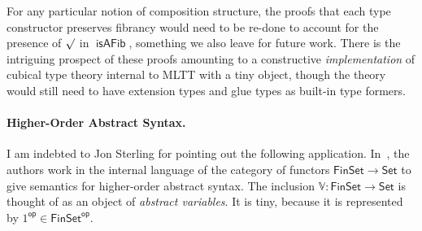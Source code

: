 \documentclass[10pt]{article}
\makeatletter
\theoremstyle{definition}
\let\oldequiv\equiv%
\renewcommand{\equiv}{\simeq}
\newcommand{\defeq}{\oldequiv}
\newcommand{\@thesum}[1]{\smsym_{(#1)}}
\newcommand{\sm}[1]{\@ifnextchar\bgroup{\@sm{#1}\sm}{\@sm{#1}}}
\newcommand{\@sm}[1]{\mathchoice{{\textstyle\@thesum{#1}}}{\@thesum{#1}}{\@thesum{#1}}{\@thesum{#1}}}
\def\prdsym{\prod}
\newcommand{\@theprd}[1]{\prdsym_{(#1)}}
\newcommand{\prd}[1]{\@ifnextchar\bgroup{\@prd{#1}\prd}{\@prd{#1}}}
\newcommand{\@prd}[1]{\mathchoice{{\textstyle\@theprd{#1}}}{\@theprd{#1}}{\@theprd{#1}}{\@theprd{#1}}}
\newcommand{\lockn}[1]{\mathcal{#1}}
\newcommand{\stubra}[1]{\{\!\!\{ #1 \}\!\!\}}
\newcommand{\substuck}[2]{\stubra{#1/\lockn{#2}}}
\newcommand{\rformsym}{\surd}
\newcommand{\rforme}[2]{\ThisStyle{\raisebox{0.07em}{$\SavedStyle \rformsym_{\hspace{-0.25em}#1}$}} #2}
\newcommand{\rform}[2]{\rforme{\lockn{#1}}{#2}}
\newcommand{\op}{\mathsf{op}}
\newcommand{\Set}{\mathsf{Set}}
\newcommand{\univfib}{\mathsf{U}}
\DeclareMathOperator{\isAFib}{\mathsf{isAFib}}
\DeclareMathOperator{\AFib}{\mathsf{AFib}}
\newcommand{\Compstr}{\mathsf{C}}
\makeatother
\begin{document}
For any particular notion of composition structure, the proofs that
each type constructor preserves fibrancy would need to be re-done to
account for the presence of $\rformsym$ in $\isAFib$, something we
also leave for future work. There is the intriguing prospect of these
proofs amounting to a constructive \emph{implementation} of cubical
type theory internal to MLTT with a tiny object, though the
theory would still need to have extension types and glue types as
built-in type formers.

\paragraph{Higher-Order Abstract Syntax.}

\newcommand{\Viny}{\mathbb{V}}
\newcommand{\iTm}{\mathtt{Tm}}
\newcommand{\ivar}{\mathtt{var}}
\newcommand{\ilam}{\mathtt{lam}}
\newcommand{\iapp}{\mathtt{app}}
\newcommand{\isubst}{\mathsf{subst}}
\newcommand{\iconj}{\mathsf{conj}}
\newcommand{\isplit}{\mathsf{splkit}}

I am indebted to Jon Sterling for pointing out the following
application. In~\cite{fpt:abstract-syntax, ft:name-value-passing}, the
authors work in the internal language of the category of functors
$\mathsf{FinSet} \to \Set$ to give semantics for higher-order abstract
syntax. The inclusion $\Viny : \mathsf{FinSet} \to \Set$ is thought of
as an object of \emph{abstract variables}. It is tiny, because it is
represented by $1^\op \in \mathsf{FinSet}^\op$.

\end{document}
